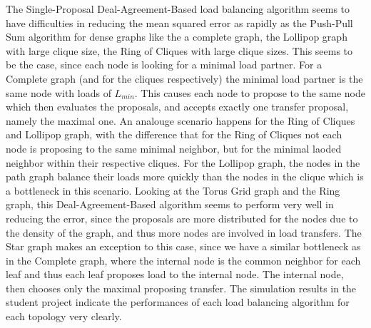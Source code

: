 The Single-Proposal Deal-Agreement-Based load balancing algorithm seems to have difficulties in reducing the mean squared error as rapidly as the Push-Pull Sum algorithm for dense graphs like the a complete graph, the Lollipop graph with large clique size, the Ring of Cliques with large clique sizes. This seems to be the case, since each node is looking for a minimal load partner. For a Complete graph (and for the cliques respectively) the minimal load partner is the same node with loads of $L_{min}$. This causes each node to propose to the same node which then evaluates the proposals, and accepts exactly one transfer proposal, namely the maximal one. An analouge scenario happens for the Ring of Cliques and Lollipop graph, with the difference that for the Ring of Cliques not each node is proposing to the same minimal neighbor, but for the minimal laoded neighbor within their respective cliques. For the Lollipop graph, the nodes in the path graph balance their loads more quickly than the nodes in the clique which is a bottleneck in this scenario. Looking at the Torus Grid graph and the Ring graph, this Deal-Agreement-Based algorithm seems to perform very well in reducing the error, since the proposals are more distributed for the nodes due to the density of the graph, and thus more nodes are involved in load transfers. The Star graph makes an exception to this case, since we have a similar bottleneck as in the Complete graph, where the internal node is the common neighbor for each leaf and thus each leaf proposes load to the internal node. The internal node, then chooses only the maximal proposing transfer. The simulation results in the student project \cite{Bayazitoglu} indicate the performances of each load balancing algorithm for each topology very clearly.
